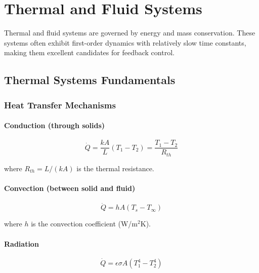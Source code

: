 
\chapter{Thermal and Fluid Systems}
\label{ch:thermal_fluid}

Thermal and fluid systems are governed by energy and mass conservation. These systems often exhibit first-order dynamics with relatively slow time constants, making them excellent candidates for feedback control.

\section{Thermal Systems Fundamentals}
\label{sec:thermal_fundamentals}

\subsection{Heat Transfer Mechanisms}

\subsubsection{Conduction (through solids)}
\begin{equation}
\dot{Q} = \frac{kA}{L}(T_1 - T_2) = \frac{T_1 - T_2}{R_{th}}
\end{equation}

where $R_{th} = L/(kA)$ is the thermal resistance.

\subsubsection{Convection (between solid and fluid)}
\begin{equation}
\dot{Q} = hA(T_s - T_\infty)
\end{equation}

where $h$ is the convection coefficient (W/m$^2$K).

\subsubsection{Radiation}
\begin{equation}
\dot{Q} = \epsilon\sigma A(T_1^4 - T_2^4)
\end{equation}

